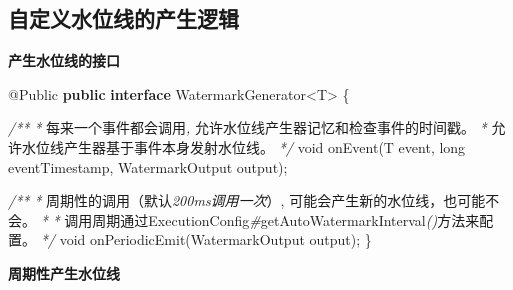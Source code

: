 \documentclass[cn,11pt,chinese]{elegantbook}
\newenvironment{Shaded}{}{}
\newcommand{\AttributeTok}[1]{\textcolor[rgb]{0.49,0.56,0.16}{#1}}
\newcommand{\CommentTok}[1]{\textcolor[rgb]{0.38,0.63,0.69}{\textit{#1}}}
\newcommand{\DataTypeTok}[1]{\textcolor[rgb]{0.56,0.13,0.00}{#1}}
\newcommand{\FunctionTok}[1]{\textcolor[rgb]{0.02,0.16,0.49}{#1}}
\newcommand{\KeywordTok}[1]{\textcolor[rgb]{0.00,0.44,0.13}{\textbf{#1}}}
\newcommand{\NormalTok}[1]{#1}
\begin{document}
\hypertarget{ux81eaux5b9aux4e49ux6c34ux4f4dux7ebfux7684ux4ea7ux751fux903bux8f91}{%
\subsection{自定义水位线的产生逻辑}\label{ux81eaux5b9aux4e49ux6c34ux4f4dux7ebfux7684ux4ea7ux751fux903bux8f91}}

\textbf{产生水位线的接口}

\begin{Shaded}
\begin{Highlighting}[]
\AttributeTok{@Public}
\KeywordTok{public} \KeywordTok{interface}\NormalTok{ WatermarkGenerator\textless{}T\textgreater{} \{}

    \CommentTok{/**}
     \CommentTok{*}\NormalTok{ 每来一个事件都会调用}\CommentTok{,}\NormalTok{ 允许水位线产生器记忆和检查事件的时间戳。}
     \CommentTok{*}\NormalTok{ 允许水位线产生器基于事件本身发射水位线。}
     \CommentTok{*/}
    \DataTypeTok{void} \FunctionTok{onEvent}\NormalTok{(T event, }\DataTypeTok{long}\NormalTok{ eventTimestamp, WatermarkOutput output);}

    \CommentTok{/**}
     \CommentTok{*}\NormalTok{ 周期性的调用（默认}\CommentTok{200ms调用一次}\NormalTok{）, 可能会产生新的水位线，也可能不会。}
     \CommentTok{*}
     \CommentTok{*}\NormalTok{ 调用周期通过ExecutionConfig}\CommentTok{\#}\NormalTok{getAutoWatermarkInterval}\CommentTok{()}\NormalTok{方法来配置。}
     \CommentTok{*/}
    \DataTypeTok{void} \FunctionTok{onPeriodicEmit}\NormalTok{(WatermarkOutput output);}
\NormalTok{\}}
\end{Highlighting}
\end{Shaded}

\textbf{周期性产生水位线}
\end{document}
